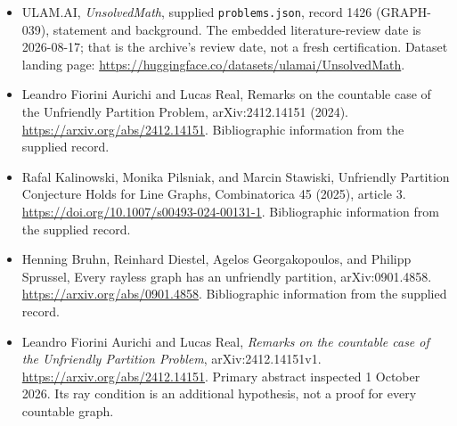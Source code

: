 \documentclass[11pt,a4paper]{article}
\begin{document}
{\small

\begin{itemize}

\item[\hypertarget{source:1426:1}{S1}] ULAM.AI, \emph{UnsolvedMath}, supplied \texttt{problems.json}, record 1426 (GRAPH-039), statement and background. The embedded literature-review date is 2026-08-17; that is the archive’s review date, not a fresh certification. Dataset landing page: \url{https://huggingface.co/datasets/ulamai/UnsolvedMath}.

\item[\hypertarget{source:1426:2}{S2}] Leandro Fiorini Aurichi and Lucas Real, Remarks on the countable case of the Unfriendly Partition Problem, arXiv:2412.14151 (2024). \url{https://arxiv.org/abs/2412.14151}. Bibliographic information from the supplied record.

\item[\hypertarget{source:1426:3}{S3}] Rafal Kalinowski, Monika Pilsniak, and Marcin Stawiski, Unfriendly Partition Conjecture Holds for Line Graphs, Combinatorica 45 (2025), article 3. \url{https://doi.org/10.1007/s00493-024-00131-1}. Bibliographic information from the supplied record.

\item[\hypertarget{source:1426:4}{S4}] Henning Bruhn, Reinhard Diestel, Agelos Georgakopoulos, and Philipp Sprussel, Every rayless graph has an unfriendly partition, arXiv:0901.4858. \url{https://arxiv.org/abs/0901.4858}. Bibliographic information from the supplied record.


\item[E1] Leandro Fiorini Aurichi and Lucas Real,
\emph{Remarks on the countable case of the Unfriendly Partition
Problem}, arXiv:2412.14151v1. \url{https://arxiv.org/abs/2412.14151}.
Primary abstract inspected 1 October 2026. Its ray condition is an
additional hypothesis, not a proof for every countable graph.

\end{itemize}

}

\label{end:1426}
\end{document}
